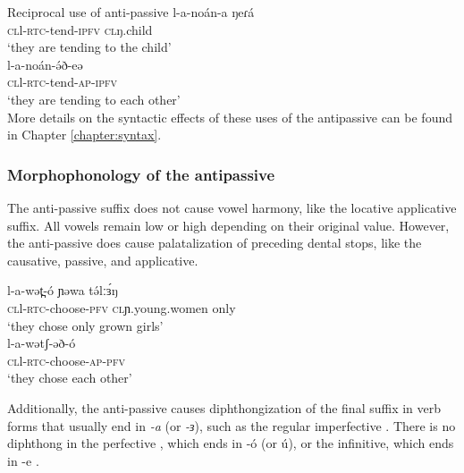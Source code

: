 \ex Reciprocal use of anti-passive
\ea \gll	l-a-noán-a 		ŋeɾá\\
	\textsc{cl}l-\textsc{rtc}-tend-\textsc{ipfv}	\textsc{cl}ŋ.child  	\\
	\glt ‘they are tending to the child’\\
\ex \gll	l-a-noán-ə́ð-eə  		\\
	\textsc{cl}l-\textsc{rtc}-tend-\textsc{ap-\textsc{ipfv}} \\
	\glt ‘they are tending to each other’\\ \label{ex:ch11:recipb}
\z
\z
More details on the syntactic effects of these uses of the antipassive can be found in Chapter \ref{chapter:syntax}.

\subsubsection{Morphophonology of the antipassive}


The anti-passive suffix does not cause vowel harmony, like the locative applicative suffix. All vowels remain low or high depending on their original value. However, the anti-passive does cause palatalization of preceding dental stops, like the causative, passive, and applicative. 

\ea
\ea \gll l-a-wət̪-ó 	ɲəwa 	tə́lːɜ́ŋ	\\
	\textsc{cl}l-\textsc{rtc}-choose-\textsc{pfv}  \textsc{cl}ɲ.young.women only\\
	\glt ‘they chose only grown girls’\\
\ex \gll	l-a-wətʃ-əð-ó\\
		\textsc{cl}l-\textsc{rtc}-choose-\textsc{ap-\textsc{pfv}}  	\\	
		\glt ‘they chose each other’\\
\z
\z

Additionally, the anti-passive causes diphthongization of the final suffix in verb forms that usually end in \textit{-a} (or \textit{-ɜ}), such as the regular imperfective . There is no diphthong in the perfective , which ends in -ó (or ú), or the infinitive, which ends in -e . 


